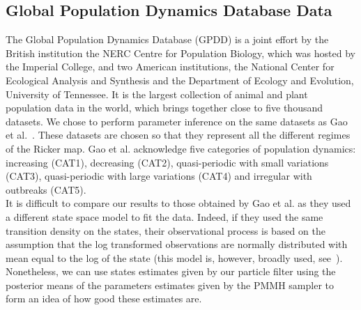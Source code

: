 \documentclass[12pt]{article}
\begin{document}
	\subsection{Global Population Dynamics Database Data}
	The Global Population Dynamics Database (GPDD) is a joint effort by the British institution the NERC Centre for Population Biology, which was hosted by the Imperial College, and two American institutions, the National Center for Ecological Analysis and Synthesis and the Department of Ecology and Evolution, University of Tennessee. It is the largest collection of animal and plant population data in the world, which brings together close to five thousand datasets. We chose to perform parameter inference on the same datasets as Gao et al.~\cite{gao2012bayesian}. These datasets are chosen so that they represent all the different regimes of the Ricker map. Gao et al. acknowledge five categories of population dynamics: increasing (CAT1), decreasing (CAT2), quasi-periodic with small variations (CAT3), quasi-periodic with large variations (CAT4) and irregular with outbreaks (CAT5). \\
	It is difficult to compare our results to those obtained by Gao et al. as they used a different state space model to fit the data. Indeed, if they used the same transition density on the states, their observational process is based on the assumption that the log transformed observations are normally distributed with mean equal to the log of the state (this model is, however, broadly used, see~\cite{de2002fitting, valpine2005state, peters2010ecological}). Nonetheless, we can use states estimates given by our particle filter using the posterior means of the parameters estimates given by the PMMH sampler to form an idea of how good these estimates are. \\
	
\end{document}
